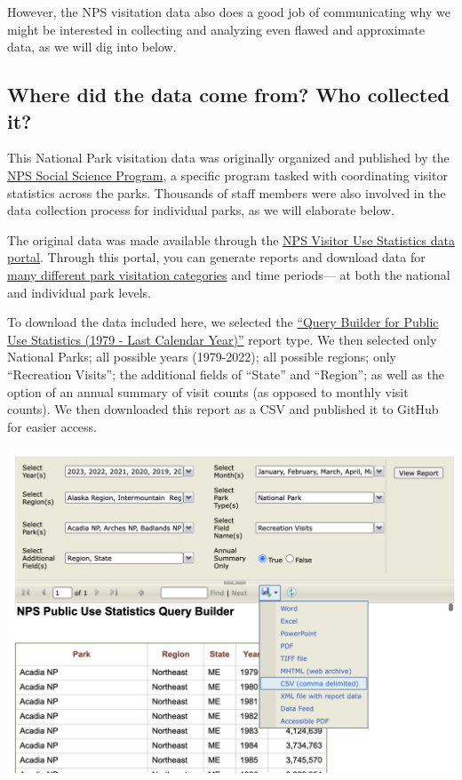 \documentclass[
  letterpaper,
  DIV=11,
  numbers=noendperiod]{scrartcl}
\begin{document}
However, the NPS visitation data also does a good job of communicating
why we might be interested in collecting and analyzing even flawed and
approximate data, as we will dig into below.

\subsection{Where did the data come from? Who collected
it?}\label{where-did-the-data-come-from-who-collected-it}

This National Park visitation data was originally organized and
published by the
\href{https://www.nps.gov/subjects/socialscience/visitor-use-statistics.htm}{NPS
Social Science Program}, a specific program tasked with coordinating
visitor statistics across the parks. Thousands of staff members were
also involved in the data collection process for individual parks, as we
will elaborate below.

The original data was made available through the
\href{https://irma.nps.gov/Stats/}{NPS Visitor Use Statistics data
portal}. Through this portal, you can generate reports and download data
for \href{https://irma.nps.gov/Stats/Reports/National}{many different
park visitation categories} and time periods--- at both the national and
individual park levels.

To download the data included here, we selected the
\href{https://irma.nps.gov/Stats/SSRSReports/National\%20Reports/Query\%20Builder\%20for\%20Public\%20Use\%20Statistics\%20(1979\%20-\%20Last\%20Calendar\%20Year)}{``Query
Builder for Public Use Statistics (1979 - Last Calendar Year)''} report
type. We then selected only National Parks; all possible years
(1979-2022); all possible regions; only ``Recreation Visits''; the
additional fields of ``State'' and ``Region''; as well as the option of
an annual summary of visit counts (as opposed to monthly visit counts).
We then downloaded this report as a CSV and published it to GitHub for
easier access.

\includegraphics{query-builder-csv-screenshot.png}
\end{document}
